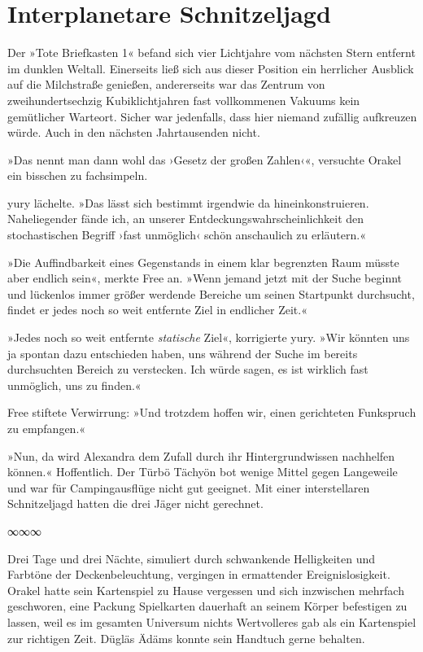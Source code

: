 \chapter{Interplanetare Schnitzeljagd}

Der »Tote Briefkasten 1« befand sich vier Lichtjahre vom nächsten Stern entfernt im dunklen Weltall. Einerseits ließ sich aus dieser Position ein herrlicher Ausblick auf die Milchstraße genießen, andererseits war das Zentrum von zweihundertsechzig Kubiklichtjahren fast vollkommenen Vakuums kein gemütlicher Warteort. Sicher war jedenfalls, dass hier niemand zufällig aufkreuzen würde. Auch in den nächsten Jahrtausenden nicht.

»Das nennt man dann wohl das ›Gesetz der großen Zahlen‹«, versuchte Orakel ein bisschen zu fachsimpeln.

yury lächelte. »Das lässt sich bestimmt irgendwie da hineinkonstruieren. Naheliegender fände ich, an unserer Entdeckungswahrscheinlichkeit den stochastischen Begriff ›fast unmöglich‹ schön anschaulich zu erläutern.«

»Die Auffindbarkeit eines Gegenstands in einem klar begrenzten Raum müsste aber endlich sein«, merkte Free an. »Wenn jemand jetzt mit der Suche beginnt und lückenlos immer größer werdende Bereiche um seinen Startpunkt durchsucht, findet er jedes noch so weit entfernte Ziel in endlicher Zeit.«

»Jedes noch so weit entfernte \emph{statische} Ziel«, korrigierte yury. »Wir könnten uns ja spontan dazu entschieden haben, uns während der Suche im bereits durchsuchten Bereich zu verstecken. Ich würde sagen, es ist wirklich fast unmöglich, uns zu finden.«

Free stiftete Verwirrung: »Und trotzdem hoffen wir, einen gerichteten Funkspruch zu empfangen.«

»Nun, da wird Alexandra dem Zufall durch ihr Hintergrundwissen nachhelfen können.« Hoffentlich. Der Türbö Tächyön bot wenige Mittel gegen Langeweile und war für Campingausflüge nicht gut geeignet. Mit einer interstellaren Schnitzeljagd hatten die drei Jäger nicht gerechnet.

\begin{center}
∞∞∞
\end{center}

Drei Tage und drei Nächte, simuliert durch schwankende Helligkeiten und Farbtöne der Deckenbeleuchtung, vergingen in ermattender Ereignislosigkeit. Orakel hatte sein Kartenspiel zu Hause vergessen und sich inzwischen mehrfach geschworen, eine Packung Spielkarten dauerhaft an seinem Körper befestigen zu lassen, weil es im gesamten Universum nichts Wertvolleres gab als ein Kartenspiel zur richtigen Zeit. Dügläs Ädäms konnte sein Handtuch gerne behalten.

